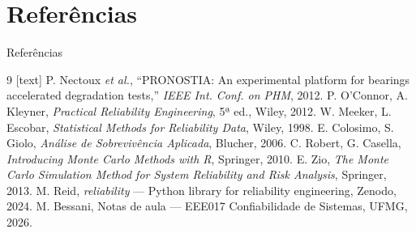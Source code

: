 \documentclass{beamer}
\begin{document}
\section{Referências}
\begin{frame}{Referências}
    \footnotesize
    \begin{thebibliography}{9}
        [text]
         P. Nectoux \textit{et al.}, ``PRONOSTIA: An experimental platform for bearings accelerated degradation tests,'' \textit{IEEE Int. Conf. on PHM}, 2012.
         P. O'Connor, A. Kleyner, \textit{Practical Reliability Engineering}, 5ª ed., Wiley, 2012.
         W. Meeker, L. Escobar, \textit{Statistical Methods for Reliability Data}, Wiley, 1998.
         E. Colosimo, S. Giolo, \textit{Análise de Sobrevivência Aplicada}, Blucher, 2006.
         C. Robert, G. Casella, \textit{Introducing Monte Carlo Methods with R}, Springer, 2010.
         E. Zio, \textit{The Monte Carlo Simulation Method for System Reliability and Risk Analysis}, Springer, 2013.
         M. Reid, \textit{reliability} --- Python library for reliability engineering, Zenodo, 2024.
         M. Bessani, Notas de aula --- EEE017 Confiabilidade de Sistemas, UFMG, 2026.
    \end{thebibliography}
\end{frame}
\end{document}
